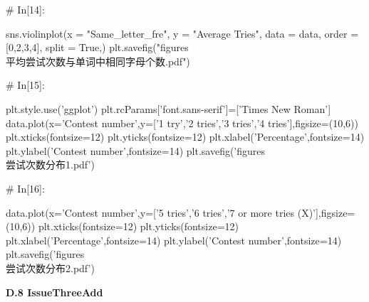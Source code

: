 \documentclass{MathModeling}
\begin{document}
\begin{python}
# In[14]:


sns.violinplot(x = "Same_letter_fre",
               y = "Average Tries",
               data = data,
               order = [0,2,3,4],
               split = True,)
plt.savefig("figures\\平均尝试次数与单词中相同字母个数.pdf")


# In[15]:


plt.style.use('ggplot')
plt.rcParams['font.sans-serif']=['Times New Roman']
data.plot(x='Contest number',y=['1 try','2 tries','3 tries','4 tries'],figsize=(10,6))
plt.xticks(fontsize=12)
plt.yticks(fontsize=12)
plt.xlabel('Percentage',fontsize=14)
plt.ylabel('Contest number',fontsize=14)
plt.savefig('figures\\尝试次数分布1.pdf')


# In[16]:


data.plot(x='Contest number',y=['5 tries','6 tries','7 or more tries (X)'],figsize=(10,6))
plt.xticks(fontsize=12)
plt.yticks(fontsize=12)
plt.xlabel('Percentage',fontsize=14)
plt.ylabel('Contest number',fontsize=14)
plt.savefig('figures\\尝试次数分布2.pdf')


\end{python}
\newpage
\textbf{D.8 IssueThreeAdd}
\end{document}
